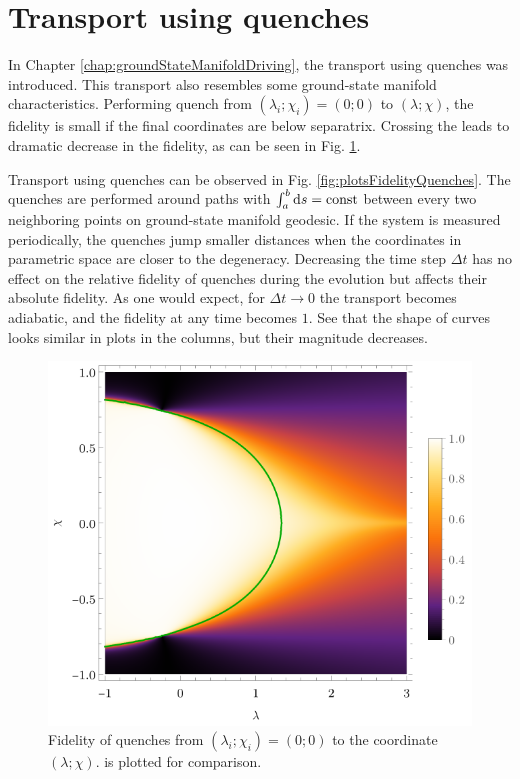 \section{Transport using quenches}
In Chapter \ref{chap:groundStateManifoldDriving}, the transport using quenches was introduced. This transport also resembles some ground-state manifold characteristics. Performing quench from $(\lambda_i;\chi_i)=(0;0)$ to $(\lambda;\chi)$, the fidelity is small if the final coordinates are below separatrix. Crossing the  leads to dramatic decrease in the fidelity, as can be seen in Fig. \ref{fig:quenchFidelityFrom00}.

Transport using quenches can be observed in Fig. \ref{fig:plotsFidelityQuenches}. The quenches are performed around paths with $\int_{a}^{b} \mathrm{d} s=\text{const}$ between every two neighboring points on ground-state manifold geodesic. If the system is measured periodically, the quenches jump smaller distances when the coordinates in parametric space are closer to the degeneracy. Decreasing the time step $\Delta t$ has no effect on the relative fidelity of quenches during the evolution but affects their absolute fidelity. As one would expect, for $\Delta t\rightarrow 0$ the transport becomes adiabatic, and the fidelity at any time becomes $1$. See that the shape of curves looks similar in plots in the columns, but their magnitude decreases.

\begin{figure}[h]
    \centering
    \vspace{30pt}\includegraphics[scale=1.2]{../img/quenchFidelityFrom00.pdf}
    \caption{Fidelity of quenches from $(\lambda_i;\chi_i)=(0;0)$ to the coordinate $(\lambda;\chi)$.  is plotted for comparison.}
    \label{fig:quenchFidelityFrom00}    
\end{figure}

